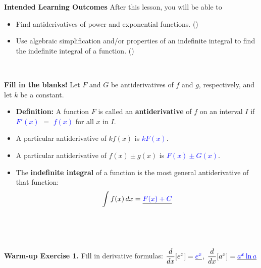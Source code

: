 \documentclass[10pt]{article}
\begin{document}
\pagestyle{otherpages}
\thispagestyle{firstpage}

\textbf{Intended Learning Outcomes}
After this lesson, you will be able to 

\begin{itemize}
    \item Find antiderivatives of power and exponential functions. ()
    \item Use algebraic simplification and/or properties of an indefinite integral to find the indefinite integral of a function. ()

\end{itemize}

\vspace{-0.6cm}

\hrulefill\\

\begin{center}
\end{center}

{\bf\color{blue} Fill in the blanks!} Let $F$ and $G$ be antiderivatives of $f$ and $g$, respectively, and let $k$ be a constant.

\begin{itemize}
\item {\bf Definition:} A function $F$ is called an {\bf antiderivative} of $f$ on an interval $I$ if \underline{\textcolor{blue}{$F'(x)$}} $=$ \underline{\textcolor{blue}{$f(x)$}} for all $x$ in $I$.
\item A particular antiderivative of $kf(x)$ is \underline{\textcolor{blue}{$kF(x)$}}.
\item A particular antiderivative of $f(x)\pm g(x)$ is \underline{\textcolor{blue}{$F(x)\pm G(x)$}}.
\item The {\bf indefinite integral} of a function is the most general antiderivative of that function: 
\[\displaystyle\int f(x)\,dx = \underline{\textcolor{blue}{F(x)+C}}\]
\end{itemize}
\

\hrulefill

\

\begin{center}
\end{center}

{\bf\color{blue} Warm-up Exercise 1.} Fill in derivative formulas:  
$\dfrac{d}{dx}[e^x] = \underline{\textcolor{blue}{e^x}}$, \quad
$\dfrac{d}{dx}[a^x] = \underline{\textcolor{blue}{a^x \ln a}}$
\end{document}
